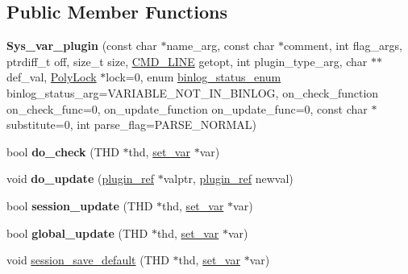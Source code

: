 \subsection*{Public Member Functions}
\begin{DoxyCompactItemize}
\item 
\mbox{\label{classSys__var__plugin_a8b651be1ea88f45790e98ab551131bcd}} 
{\bfseries Sys\+\_\+var\+\_\+plugin} (const char $\ast$name\+\_\+arg, const char $\ast$comment, int flag\+\_\+args, ptrdiff\+\_\+t off, size\+\_\+t size, \mbox{\hyperlink{structCMD__LINE}{C\+M\+D\+\_\+\+L\+I\+NE}} getopt, int plugin\+\_\+type\+\_\+arg, char $\ast$$\ast$def\+\_\+val, \mbox{\hyperlink{classPolyLock}{Poly\+Lock}} $\ast$lock=0, enum \mbox{\hyperlink{classsys__var_a664520ec82191888717c86085bfa83ce}{binlog\+\_\+status\+\_\+enum}} binlog\+\_\+status\+\_\+arg=V\+A\+R\+I\+A\+B\+L\+E\+\_\+\+N\+O\+T\+\_\+\+I\+N\+\_\+\+B\+I\+N\+L\+OG, on\+\_\+check\+\_\+function on\+\_\+check\+\_\+func=0, on\+\_\+update\+\_\+function on\+\_\+update\+\_\+func=0, const char $\ast$substitute=0, int parse\+\_\+flag=P\+A\+R\+S\+E\+\_\+\+N\+O\+R\+M\+AL)
\item 
\mbox{\label{classSys__var__plugin_a045b667f89c02d0aa105e443f8fdaa48}} 
bool {\bfseries do\+\_\+check} (T\+HD $\ast$thd, \mbox{\hyperlink{classset__var}{set\+\_\+var}} $\ast$var)
\item 
\mbox{\label{classSys__var__plugin_acf206f5c0f3bef0eb05e546f4b6e3647}} 
void {\bfseries do\+\_\+update} (\mbox{\hyperlink{structst__plugin__int}{plugin\+\_\+ref}} $\ast$valptr, \mbox{\hyperlink{structst__plugin__int}{plugin\+\_\+ref}} newval)
\item 
\mbox{\label{classSys__var__plugin_a4e40f3800f16383683000b7883b71112}} 
bool {\bfseries session\+\_\+update} (T\+HD $\ast$thd, \mbox{\hyperlink{classset__var}{set\+\_\+var}} $\ast$var)
\item 
\mbox{\label{classSys__var__plugin_a6d07e71921826a98742ac60f329f4e0e}} 
bool {\bfseries global\+\_\+update} (T\+HD $\ast$thd, \mbox{\hyperlink{classset__var}{set\+\_\+var}} $\ast$var)
\item 
void \mbox{\hyperlink{classSys__var__plugin_af959987c1a741e2b421be3924efe8eb0}{session\+\_\+save\+\_\+default}} (T\+HD $\ast$thd, \mbox{\hyperlink{classset__var}{set\+\_\+var}} $\ast$var)
$$
\end{DoxyCompactItemize}
